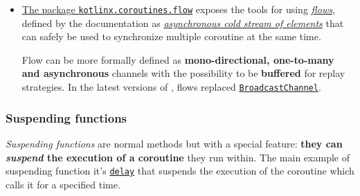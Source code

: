 \begin{itemize}
	\textbf{The semantic of \textit{send/receive} operations depends on the nature of the channel} that is determinated by its capacity, but the communication can be \textbf{synchronous} or \textbf{asynchronous} with also some little variations of these (for example, \textbf{rendez-vous}).
	Notice that, as anticipated, a channel can be safely shared between coroutines, but the developer has to pay attention because the \texttt{receive} operation can quickly lead to competition problems if invoked  from two or more coroutines in parallel.
	
	$\big[$See \href{https://github.com/LM-96/Activity-Project-Operating-Systems-M-/blob/main/code/kotlin/unibo.apos.examples/src/main/kotlin/unibo/apos/examples/ChannelPiCalculation.kt}{\texttt{ChannelPiCalculation.kt}} for a basic example$\big]$
	
	\item \underline{The package \href{https://kotlinlang.org/api/kotlinx.coroutines/kotlinx-coroutines-core/kotlinx.coroutines.flow/}{\texttt{kotlinx.coroutines.flow}}} exposes the tools for using \href{https://kotlinlang.org/docs/flow.html}{\textit{flows}},  defined by the documentation as \href{https://kotlinlang.org/docs/flow.html#flows-are-cold}{\textit{asynchronous cold stream of elements}} that can safely be used to synchronize multiple coroutine at the same time.
	
	Flow can be more formally defined as \textbf{mono-directional, one-to-many and asynchronous} channels with the possibility to be \textbf{buffered} for replay strategies. In the latest versions of \Kotlin, flows replaced \href{https://kotlinlang.org/api/kotlinx.coroutines/kotlinx-coroutines-core/kotlinx.coroutines.channels/-broadcast-channel/}{\texttt{BroadcastChannel}}.
\end{itemize}

\subsubsection{Suspending functions}

\textit{Suspending functions} are normal \Kotlin methods but with a special feature: \textbf{they can \textit{suspend} the execution of a coroutine} they run within. The main example of suspending function it's \href{https://kotlinlang.org/api/kotlinx.coroutines/kotlinx-coroutines-core/kotlinx.coroutines/delay.html}{\texttt{delay}} that suspends the execution of the coroutine which calls it for a specified time.

